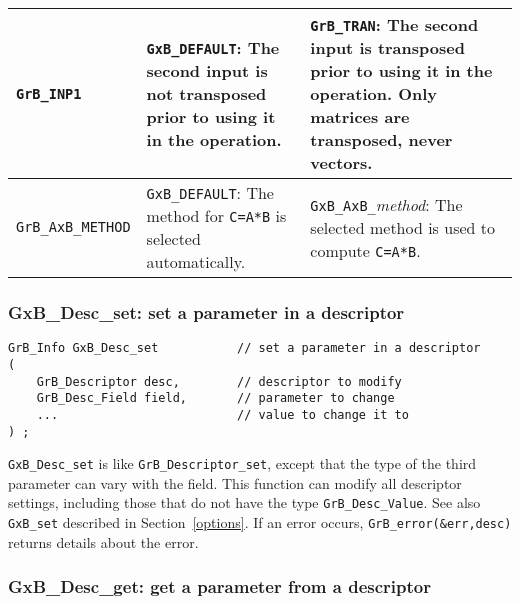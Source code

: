 \documentclass[12pt]{article}
\begin{document}
{{\begin{tabular}{|l|p{2.4in}|p{2.2in}|}
\verb'GrB_INP1'
    & \verb'GxB_DEFAULT':
    The second input is not transposed prior to using it in the operation.
    & \verb'GrB_TRAN':
    The second input is transposed prior to using it in the operation.  Only
    matrices are transposed, never vectors. \\

\hline

\verb'GrB_AxB_METHOD'
    & \verb'GxB_DEFAULT':
    The method for \verb'C=A*B' is selected automatically.
    & \verb'GxB_AxB_'{\em method}: The selected method is used to compute
    \verb'C=A*B'.  \\

\hline
\end{tabular}
}

\newpage
\subsubsection{{\sf GxB\_Desc\_set:}  set a parameter in a descriptor}
\label{desc_set}

\begin{mdframed}[userdefinedwidth=6in]
{\footnotesize
\begin{verbatim}
GrB_Info GxB_Desc_set           // set a parameter in a descriptor
(
    GrB_Descriptor desc,        // descriptor to modify
    GrB_Desc_Field field,       // parameter to change
    ...                         // value to change it to
) ;
\end{verbatim} } \end{mdframed}

\verb'GxB_Desc_set' is like \verb'GrB_Descriptor_set', except that the type of
the third parameter can vary with the field.   This function can modify all
descriptor settings, including those that do not have the type
\verb'GrB_Desc_Value'.  See also \verb'GxB_set' described in
Section~\ref{options}.  If an error occurs, \verb'GrB_error(&err,desc)' returns
details about the error.

\subsubsection{{\sf GxB\_Desc\_get:}  get a parameter from a descriptor}
\label{desc_get}

}
\end{document}
